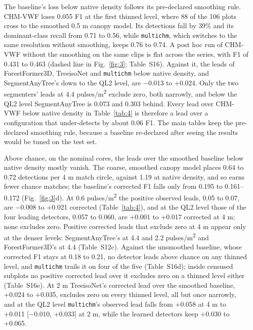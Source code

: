 \documentclass[preprint,12pt,authoryear,a4paper]{elsarticle}
\begin{document}
The baseline's loss below native density follows its pre-declared smoothing
rule. CHM-VWF loses 0.055 F1 at the first thinned level, where 88 of the 106
plots cross to the smoothed 0.5 m canopy model. Its detections fall by 39\% and
its dominant-class recall from 0.71 to 0.56, while \texttt{multichm}, which switches to
the same resolution without smoothing, keeps 0.76 to 0.74. A post hoc run of
CHM-VWF without the smoothing on the same clips is flat across the series, with
F1 of 0.431 to 0.463 (dashed line in Fig.~\ref{fig:3}; Table~S16). Against it, the leads
of ForestFormer3D, TreeisoNet and \texttt{multichm} below native density, and
SegmentAnyTree's down to the QL2 level, are $-$0.013 to +0.024. Only the two
segmenters' leads at 4.4 pulses/m\textsuperscript{2} exclude zero, both narrowly, and below the
QL2 level SegmentAnyTree is 0.073 and 0.303 behind. Every lead over CHM-VWF
below native density in Table~\ref{tab:4} is therefore a lead over a configuration that
under-detects by about 0.06 F1. The main tables keep the pre-declared smoothing
rule, because a baseline re-declared after seeing the results would be tuned on
the test set.

Above chance, on the nominal cores, the leads over the smoothed baseline below
native density mostly vanish. The coarse, smoothed canopy model places 0.64 to
0.72 detections per 4 m match circle, against 1.19 at native density, and so
earns fewer chance matches; the baseline's corrected F1 falls only from 0.195 to
0.161--0.172 (Fig.~\ref{fig:3}d). At 0.6 pulses/m\textsuperscript{2} the positive observed leads, 0.05 to
0.07, are $-$0.008 to +0.021 corrected (Table~\ref{tab:4}), and at the QL2 level those of
the four leading detectors, 0.057 to 0.060, are +0.001 to +0.017 corrected at 4
m; none excludes zero. Positive corrected leads that exclude zero at 4 m appear
only at the denser levels: SegmentAnyTree's at 4.4 and 2.2 pulses/m\textsuperscript{2} and
ForestFormer3D's at 4.4 (Table~S12c). Against the unsmoothed baseline, whose
corrected F1 stays at 0.18 to 0.21, no detector leads above chance on any
thinned level, and \texttt{multichm} trails it on four of the five (Table~S16d); inside
censused subplots no positive corrected lead over it excludes zero on a thinned
level either (Table~S16e). At 2 m TreeisoNet's corrected lead over the smoothed
baseline, +0.024 to +0.035, excludes zero on every thinned level, all but once
narrowly, and at the QL2 level \texttt{multichm}'s observed lead falls from +0.058 at 4
m to +0.011 [$-$0.010, +0.033] at 2 m, while the learned detectors keep +0.030 to
+0.065.
\end{document}

